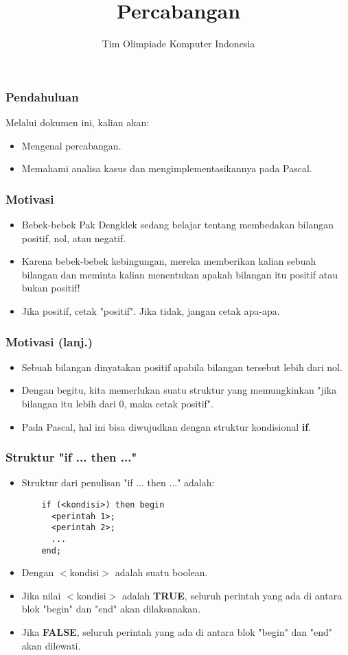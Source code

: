 \documentclass{beamer}
\title{Percabangan}
\author{Tim Olimpiade Komputer Indonesia}
\date{}
\begin{document}
\begin{frame}
\titlepage
\end{frame}

\begin{frame}
\frametitle{Pendahuluan}
Melalui dokumen ini, kalian akan:
\begin{itemize}
  \item Mengenal percabangan.
  \item Memahami analisa kasus dan mengimplementasikannya pada Pascal.
\end{itemize}
\end{frame}

\begin{frame}
\frametitle{Motivasi}
\begin{itemize}
  \item Bebek-bebek Pak Dengklek sedang belajar tentang membedakan bilangan positif, nol, atau negatif.
  \item Karena bebek-bebek kebingungan, mereka memberikan kalian sebuah bilangan dan meminta kalian menentukan apakah bilangan itu positif atau bukan positif!
  \item Jika positif, cetak "positif". Jika tidak, jangan cetak apa-apa.
\end{itemize}
\end{frame}

\begin{frame}
\frametitle{Motivasi (lanj.)}
\begin{itemize}
  \item Sebuah bilangan dinyatakan positif apabila bilangan tersebut lebih dari nol.
  \item Dengan begitu, kita memerlukan suatu struktur yang memungkinkan "\alert{jika} bilangan itu lebih dari 0, \alert{maka} cetak positif".
  \item Pada Pascal, hal ini bisa diwujudkan dengan struktur kondisional \alert{\textbf{if}}.
\end{itemize}
\end{frame}

\begin{frame}[fragile]
\frametitle{Struktur "if ... then ..."}
\begin{itemize}
  \item Struktur dari penulisan "if ... then ..." adalah:
  \begin{lstlisting}
    if (<kondisi>) then begin
      <perintah 1>;
      <perintah 2>;
      ...
    end;
  \end{lstlisting}

  \item Dengan $<$kondisi$>$ adalah suatu boolean.
  \item Jika nilai $<$kondisi$>$ adalah \textbf{TRUE}, seluruh perintah yang ada di antara blok "begin" dan "end" akan dilaksanakan.
  \item Jika \textbf{FALSE}, seluruh perintah yang ada di antara blok "begin" dan "end" akan dilewati.
\end{itemize}
\end{frame}
\end{document}
